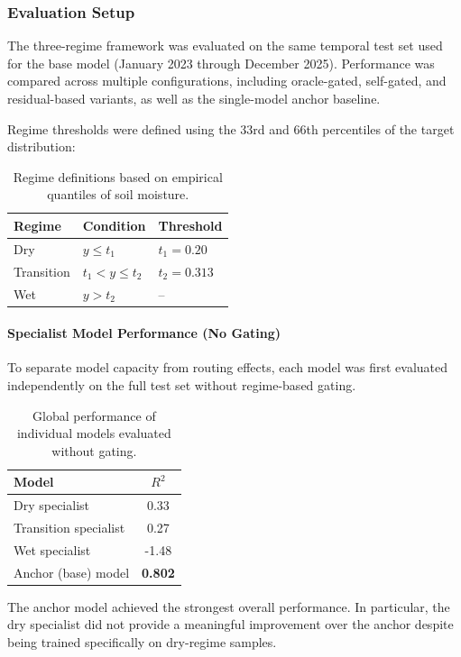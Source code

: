 \subsubsection*{Evaluation Setup}
The three-regime framework was evaluated on the same temporal test set used for the base model (January 2023 through December 2025). Performance was compared across multiple configurations, including oracle-gated, self-gated, and residual-based variants, as well as the single-model anchor baseline.

Regime thresholds were defined using the 33rd and 66th percentiles of the target distribution:

\begin{table}[H]
\centering
\begin{tabular}{lll}
\toprule
\textbf{Regime} & \textbf{Condition} & \textbf{Threshold} \\
\midrule
Dry & $y \leq t_1$ & $t_1 = 0.20$ \\
Transition & $t_1 < y \leq t_2$ & $t_2 = 0.313$ \\
Wet & $y > t_2$ & -- \\
\bottomrule
\end{tabular}
\caption{Regime definitions based on empirical quantiles of soil moisture.}
\end{table}

\paragraph{Specialist Model Performance (No Gating)}
To separate model capacity from routing effects, each model was first evaluated independently on the full test set without regime-based gating.

\begin{table}[H]
\centering
\begin{tabular}{lc}
\toprule
\textbf{Model} & \textbf{$R^2$} \\
\midrule
Dry specialist & 0.33 \\
Transition specialist & 0.27 \\
Wet specialist & -1.48 \\
Anchor (base) model & \textbf{0.802} \\
\bottomrule
\end{tabular}
\caption{Global performance of individual models evaluated without gating.}
\end{table}

The anchor model achieved the strongest overall performance. In particular, the dry specialist did not provide a meaningful improvement over the anchor despite being trained specifically on dry-regime samples.

